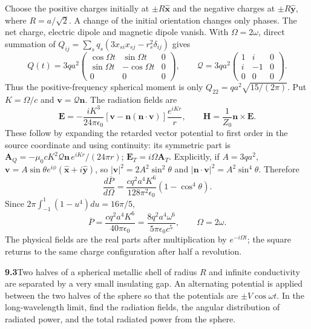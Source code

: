 Choose the positive charges initially at $\pm R\hat{\mathbf x}$ and the
negative charges at $\pm R\hat{\mathbf y}$, where $R=a/\sqrt2$. A change
of the initial orientation changes only phases. The net charge, electric
dipole and magnetic dipole vanish. With $\Omega=2\omega$, direct summation
of $Q_{ij}=\sum_s q_s(3x_{si}x_{sj}-r_s^2\delta_{ij})$ gives
\[
Q(t)=3qa^2\begin{pmatrix}
\cos\Omega t&\sin\Omega t&0\\
\sin\Omega t&-\cos\Omega t&0\\0&0&0
\end{pmatrix},\qquad
\mathcal Q=3qa^2\begin{pmatrix}1&i&0\\i&-1&0\\0&0&0\end{pmatrix}.
\]
Thus the positive-frequency spherical moment is only
$Q_{22}=qa^2\sqrt{15/(2\pi)}$. Put $K=\Omega/c$ and
$\mathbf v=\mathcal Q\mathbf n$. The radiation fields are
\[
\boxed{\mathbf E=-\frac{iK^3}{24\pi\epsilon_0}
 [\mathbf v-\mathbf n(\mathbf n\cdot\mathbf v)]\frac{e^{iKr}}r,
\qquad \mathbf H=\frac1{Z_0}\mathbf n\times\mathbf E.}
\]
These follow by expanding the retarded vector potential to first order
in the source coordinate and using continuity: its symmetric part is
$\mathbf A_Q=-\mu_0cK^2\mathcal Q\mathbf n\,e^{iKr}/(24\pi r)$;
$\mathbf E_T=i\Omega\mathbf A_T$.
Explicitly, if $A=3qa^2$,
$\mathbf v=A\sin\theta e^{i\phi}(\hat{\mathbf x}+i\hat{\mathbf y})$,
so $|\mathbf v|^2=2A^2\sin^2\theta$ and
$|\mathbf n\cdot\mathbf v|^2=A^2\sin^4\theta$. Therefore
\[
\boxed{\frac{d\overline P}{d\Omega}
=\frac{cq^2a^4K^6}{128\pi^2\epsilon_0}(1-\cos^4\theta).}
\]
Since $2\pi\int_{-1}^1(1-u^4)du=16\pi/5$,
\[
\boxed{\overline P=\frac{cq^2a^4K^6}{40\pi\epsilon_0}
=\frac{8q^2a^4\omega^6}{5\pi\epsilon_0c^5},\qquad
\Omega=2\omega.}
\]
The physical fields are the real parts after multiplication by
$e^{-i\Omega t}$; the square returns to the same charge configuration
after half a revolution.

\par\bigskip
\noindent\textbf{9.3}\quad Two halves of a spherical metallic shell of radius $R$ and infinite conductivity are separated by a very small insulating gap. An alternating potential is applied between the two halves of the sphere so that the potentials are $\pm V\cos\omega t$. In the long-wavelength limit, find the radiation fields, the angular distribution of radiated power, and the total radiated power from the sphere.
\solution

